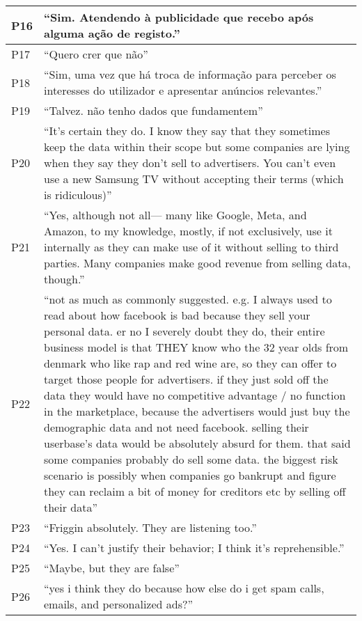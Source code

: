 \begin{table}[H]
\begin{longtable}{p{3cm} p{13cm}}
        \hline
        P16 & ``Sim. Atendendo à publicidade que recebo após alguma ação de registo.'' \\
        \hline
        P17 & ``Quero crer que não'' \\
        \hline
        P18 & ``Sim, uma vez que há troca de informação para perceber os interesses do utilizador e apresentar anúncios relevantes.'' \\
        \hline
        P19 & ``Talvez. não tenho dados que fundamentem'' \\
        \hline
        P20 & ``It's certain they do. I know they say that they sometimes keep the data within their scope but some companies are lying when they say they don't sell to advertisers. You can't even use a new Samsung TV without accepting their terms (which is ridiculous)'' \\
        \hline
        P21 & ``Yes, although not all— many like Google, Meta, and Amazon, to my knowledge, mostly, if not exclusively, use it internally as they can make use of it without selling to third parties. Many companies make good revenue from selling data, though.'' \\
        \hline
        P22 & ``not as much as commonly suggested.  e.g. I always used to read about how facebook is bad because they sell your personal data.  er no I severely doubt they do, their entire business model is that THEY know who the 32 year olds from denmark who like rap and red wine are, so they can offer to target those people for advertisers.  if they just sold off the data they would have no competitive advantage / no function in the marketplace, because the advertisers would just buy the demographic data and not need facebook.  selling their userbase's data would be absolutely absurd for them.  that said some companies probably do sell some data.  the biggest risk scenario is possibly when companies go bankrupt and figure they can reclaim a bit of money for creditors etc by selling off their data'' \\
        \hline
        P23 & ``Friggin absolutely. They are listening too.'' \\
        \hline
        P24 & ``Yes. I can't justify their behavior; I think it's reprehensible.'' \\
        \hline
        P25 & ``Maybe, but they are false'' \\
        \hline
        P26 & ``yes i think they do because how else do i get spam calls, emails, and personalized ads?'' \\
        \hline

\end{longtable}
\end{table}
